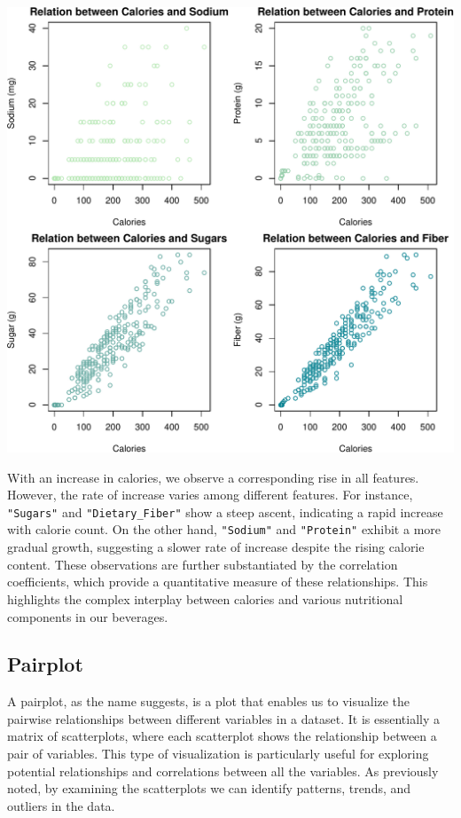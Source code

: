 \documentclass[
]{article}
\begin{document}
\begin{center}\includegraphics{Statistical_Learning_Final_Report_files/figure-latex/scatterplot-1} \end{center}

With an increase in calories, we observe a corresponding rise in all
features. However, the rate of increase varies among different features.
For instance, \texttt{"Sugars"} and \texttt{"Dietary\_Fiber"} show a
steep ascent, indicating a rapid increase with calorie count. On the
other hand, \texttt{"Sodium"} and \texttt{"Protein"} exhibit a more
gradual growth, suggesting a slower rate of increase despite the rising
calorie content. These observations are further substantiated by the
correlation coefficients, which provide a quantitative measure of these
relationships. This highlights the complex interplay between calories
and various nutritional components in our beverages.

\subsection{Pairplot}\label{pairplot}

A pairplot, as the name suggests, is a plot that enables us to visualize
the pairwise relationships between different variables in a dataset. It
is essentially a matrix of scatterplots, where each scatterplot shows
the relationship between a pair of variables. This type of visualization
is particularly useful for exploring potential relationships and
correlations between all the variables. As previously noted, by
examining the scatterplots we can identify patterns, trends, and
outliers in the data.
\end{document}

